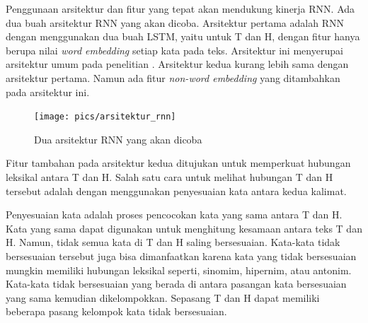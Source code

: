 	Penggunaan arsitektur dan fitur yang tepat akan mendukung kinerja RNN. Ada dua buah arsitektur RNN yang akan dicoba. Arsitektur pertama adalah RNN dengan menggunakan dua buah LSTM, yaitu untuk T dan H, dengan fitur hanya berupa nilai \textit{word embedding} setiap kata pada teks. Arsitektur ini menyerupai arsitektur umum pada penelitian \cite{snli:emnlp2015}. Arsitektur kedua kurang lebih sama dengan arsitektur pertama. Namun ada fitur \textit{non-word embedding} yang ditambahkan pada arsitektur ini. 
	\begin{figure}
		\centering
		\texttt{[image: pics/arsitektur\_rnn]}
		\caption{Dua arsitektur RNN yang akan dicoba}
		\label{fig:arsitektur_rnn}
	\end{figure}
	Fitur tambahan pada arsitektur kedua ditujukan untuk memperkuat hubungan leksikal antara T dan H. Salah satu cara untuk melihat hubungan T dan H tersebut adalah dengan menggunakan penyesuaian kata antara kedua kalimat.
	
	Penyesuaian kata adalah proses pencocokan kata yang sama antara T dan H. Kata yang sama dapat digunakan untuk menghitung kesamaan antara teks T dan H. Namun, tidak semua kata di T dan H saling bersesuaian. Kata-kata tidak bersesuaian tersebut juga bisa dimanfaatkan karena kata yang tidak bersesuaian mungkin memiliki hubungan leksikal seperti, sinomim, hipernim, atau antonim. Kata-kata tidak bersesuaian yang berada di antara pasangan kata bersesuaian yang sama kemudian dikelompokkan. Sepasang T dan H dapat memiliki beberapa pasang kelompok kata tidak bersesuaian. 
	
